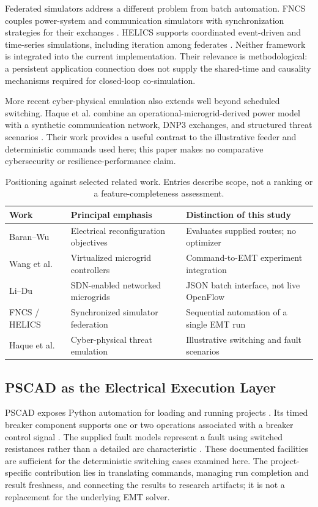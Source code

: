 Federated simulators address a different problem from batch automation. FNCS
couples power-system and communication simulators with synchronization
strategies for their exchanges \cite{ciraci2014}. HELICS supports coordinated
event-driven and time-series simulations, including iteration among federates
\cite{palmintier2017}. Neither framework is integrated into the current
implementation. Their relevance is methodological: a persistent application
connection does not supply the shared-time and causality mechanisms required
for closed-loop co-simulation.

More recent cyber-physical emulation also extends well beyond scheduled
switching. Haque et al. combine an operational-microgrid-derived power model
with a synthetic communication network, DNP3 exchanges, and structured threat
scenarios \cite{haque2025}. Their work provides a useful contrast to the
illustrative feeder and deterministic commands used here; this paper makes
no comparative cybersecurity or resilience-performance claim.

\begin{table}[tb]
\centering\small
\caption{Positioning against selected related work. Entries describe scope,
not a ranking or a feature-completeness assessment.}
\label{tab:related}
\begin{tabularx}{\textwidth}{@{}p{32mm}XX@{}}
\toprule
Work & Principal emphasis & Distinction of this study \\
\midrule
Baran--Wu \cite{baran1989} & Electrical reconfiguration objectives & Evaluates supplied routes; no optimizer \\
Wang et al. \cite{wang2020} & Virtualized microgrid controllers & Command-to-EMT experiment integration \\
Li--Du \cite{li2021} & SDN-enabled networked microgrids & JSON batch interface, not live OpenFlow \\
FNCS / HELICS \cite{ciraci2014,palmintier2017} & Synchronized simulator federation & Sequential automation of a single EMT run \\
Haque et al. \cite{haque2025} & Cyber-physical threat emulation & Illustrative switching and fault scenarios \\
\bottomrule
\end{tabularx}
\end{table}

\subsection{PSCAD as the Electrical Execution Layer}
PSCAD exposes Python automation for loading and running projects
\cite{pscadAutomation}. Its timed breaker component supports one or two
operations associated with a breaker control signal \cite{pscadTimedBreaker}.
The supplied fault models represent a fault using switched resistances rather
than a detailed arc characteristic \cite{pscadFaults}. These documented
facilities are sufficient for the deterministic switching cases examined here.
The project-specific contribution lies in translating commands, managing run
completion and result freshness, and connecting the results to research
artifacts; it is not a replacement for the underlying EMT solver.
